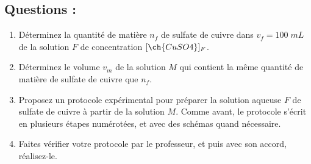 \documentclass[12pt,a4paper]{article}
\begin{document}
\subsection*{Questions : }
\begin{enumerate}[resume]
    \item Déterminez la quantité de matière $n_f$ de sulfate de cuivre dans $v_f = 100\; mL$ de la solution $F$ de concentration $[\ch{CuSO4}]_F$.
    \item Déterminez le volume $v_m$ de la solution $M$ qui contient la même quantité de matière de sulfate de cuivre que $n_f$. 
    \item Proposez un protocole expérimental pour préparer la solution aqueuse $F$ de sulfate de cuivre à partir de la solution $M$. 
    Comme avant, le protocole s'écrit en plusieurs étapes numérotées, et avec des schémas quand nécessaire. 
    \item Faites vérifier votre protocole par le professeur, et puis avec son accord, réalisez-le. 
\end{enumerate}
\end{document}

